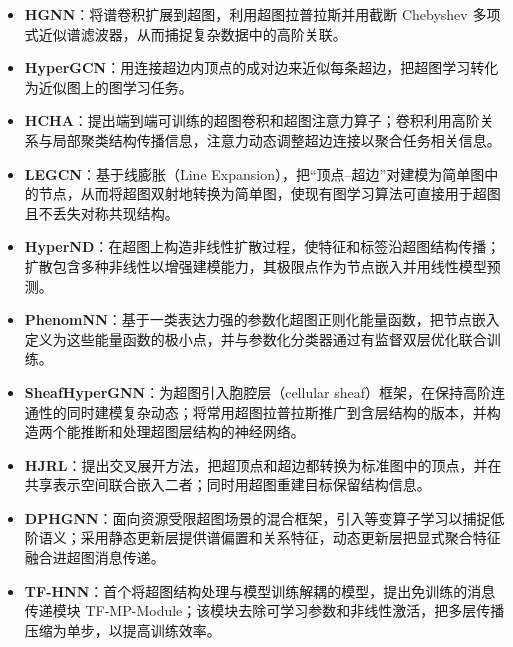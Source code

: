 \begin{itemize}
    \item \textbf{HGNN}\cite{feng2019hypergraph}：将谱卷积扩展到超图，利用超图拉普拉斯并用截断 Chebyshev 多项式近似谱滤波器，从而捕捉复杂数据中的高阶关联。
    \item \textbf{HyperGCN}\cite{yadati2019hypergcn}：用连接超边内顶点的成对边来近似每条超边，把超图学习转化为近似图上的图学习任务。
    \item \textbf{HCHA}\cite{bai2021hypergraph}：提出端到端可训练的超图卷积和超图注意力算子；卷积利用高阶关系与局部聚类结构传播信息，注意力动态调整超边连接以聚合任务相关信息。
    \item \textbf{LEGCN}\cite{yang2022semi}：基于线膨胀（Line Expansion），把“顶点–超边”对建模为简单图中的节点，从而将超图双射地转换为简单图，使现有图学习算法可直接用于超图且不丢失对称共现结构。
    \item \textbf{HyperND}\cite{prokopchik2022nonlinear}：在超图上构造非线性扩散过程，使特征和标签沿超图结构传播；扩散包含多种非线性以增强建模能力，其极限点作为节点嵌入并用线性模型预测。
    \item \textbf{PhenomNN}\cite{wang2023from}：基于一类表达力强的参数化超图正则化能量函数，把节点嵌入定义为这些能量函数的极小点，并与参数化分类器通过有监督双层优化联合训练。
    \item \textbf{SheafHyperGNN}\cite{duta2023sheaf}：为超图引入胞腔层（cellular sheaf）框架，在保持高阶连通性的同时建模复杂动态；将常用超图拉普拉斯推广到含层结构的版本，并构造两个能推断和处理超图层结构的神经网络。
    \item \textbf{HJRL}\cite{yan2024hypergraph}：提出交叉展开方法，把超顶点和超边都转换为标准图中的顶点，并在共享表示空间联合嵌入二者；同时用超图重建目标保留结构信息。
    \item \textbf{DPHGNN}\cite{saxena2024dphgnn}：面向资源受限超图场景的混合框架，引入等变算子学习以捕捉低阶语义；采用静态更新层提供谱偏置和关系特征，动态更新层把显式聚合特征融合进超图消息传递。
    \item \textbf{TF-HNN}\cite{tang2025training}：首个将超图结构处理与模型训练解耦的模型，提出免训练的消息传递模块 TF-MP-Module；该模块去除可学习参数和非线性激活，把多层传播压缩为单步，以提高训练效率。
    
    \vspace{0.5em} %
    

\end{itemize}
